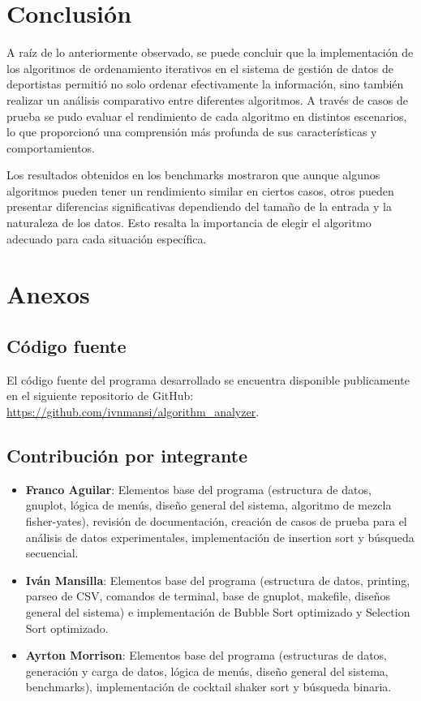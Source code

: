 \chapter{Conclusión}
A raíz de lo anteriormente observado, se puede concluir que la implementación de los algoritmos de ordenamiento iterativos en el sistema de gestión de datos de deportistas permitió no solo ordenar efectivamente la información, sino también realizar un análisis comparativo entre diferentes algoritmos. A través de casos de prueba se pudo evaluar el rendimiento de cada algoritmo en distintos escenarios, lo que proporcionó una comprensión más profunda de sus características y comportamientos.

Los resultados obtenidos en los benchmarks mostraron que aunque algunos algoritmos pueden tener un rendimiento similar en ciertos casos, otros pueden presentar diferencias significativas dependiendo del tamaño de la entrada y la naturaleza de los datos. Esto resalta la importancia de elegir el algoritmo adecuado para cada situación específica.

\chapter{Anexos}
\section{Código fuente}
El código fuente del programa desarrollado se encuentra disponible publicamente en el siguiente repositorio de GitHub: \url{https://github.com/ivnmansi/algorithm_analyzer}.
\section{Contribución por integrante}
\begin{itemize}
    \item \textbf{Franco Aguilar}: Elementos base del programa (estructura de datos, gnuplot, lógica de menús, diseño general del sistema, algoritmo de mezcla fisher-yates), revisión de documentación, creación de casos de prueba para el análisis de datos experimentales, implementación de insertion sort y búsqueda secuencial.
    \item \textbf{Iván Mansilla}: Elementos base del programa (estructura de datos, printing, parseo de CSV, comandos de terminal, base de gnuplot, makefile, diseños general del sistema) e implementación de Bubble Sort optimizado y Selection Sort optimizado.
    \item \textbf{Ayrton Morrison}: Elementos base del programa (estructuras de datos, generación y carga de datos, lógica de menús, diseño general del sistema, benchmarks), implementación de cocktail shaker sort y búsqueda binaria.
\end{itemize}